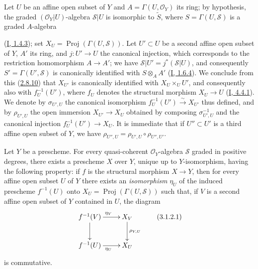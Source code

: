 \begin{env}[3.1.1]
Let $U$ be an affine open subset of $Y$ and $A=\Gamma(U,\mathcal{O}_Y)$ its
ring; by hypothesis, the graded $(\mathcal{O}_Y|U)$-algebra $\mathcal{S}|U$
is isomorphic to $\widetilde{S}$, where $S=\Gamma(U,\mathcal{S})$ is a graded
$A$-algebra


(\hyperref[I.1.4.3]{I, 1.4.3}); set
$X_U=\operatorname{Proj}(\Gamma(U,\mathcal{S}))$. Let $U'\subset U$ be a
second affine open subset of $Y$, $A'$ its ring, and $j:U'\to U$ the
canonical injection, which corresponds to the restriction homomorphism
$A\to A'$; we have $\mathcal{S}|U'=j^*(\mathcal{S}|U)$, and consequently
$S'=\Gamma(U',\mathcal{S})$ is canonically identified with $S\otimes_A A'$
(\hyperref[I.1.6.4]{I, 1.6.4}). We conclude from this
(\hyperref[II.2.8.10]{2.8.10}) that $X_{U'}$ is canonically identified
with $X_U\times_U U'$, and consequently also with $f_U^{-1}(U')$, where $f_U$
denotes the structural morphism $X_U\to U$
(\hyperref[I.4.4.1]{I, 4.4.1}). We denote by $\sigma_{U',U}$ the
canonical isomorphism $f_U^{-1}(U')\xrightarrow{\sim}X_{U'}$ thus defined,
and by $\rho_{U',U}$ the open immersion $X_{U'}\to X_U$ obtained by composing
$\sigma_{U',U}^{-1}$ and the canonical injection $f_U^{-1}(U')\to X_U$. It is
immediate that if $U''\subset U'$ is a third affine open subset of $Y$, we
have $\rho_{U'',U}=\rho_{U',U}\circ\rho_{U'',U'}$.
\end{env}

\begin{proposition}[3.1.2]
\label{II.3.1.2}
Let $Y$ be a prescheme. For every quasi-coherent $\mathcal{O}_Y$-algebra
$\mathcal{S}$ graded in positive degrees, there exists a prescheme $X$ over
$Y$, unique up to $Y$-isomorphism, having the following property: if $f$ is
the structural morphism $X\to Y$, then for every affine open subset $U$ of
$Y$ there exists an \emph{isomorphism} $\eta_U$ of the induced prescheme
$f^{-1}(U)$ onto $X_U=\operatorname{Proj}(\Gamma(U,\mathcal{S}))$ such that,
if $V$ is a second affine open subset of $Y$ contained in $U$, the diagram
\[
\label{II.3.1.2.1}
  \xymatrix{
    f^{-1}(V)\ar[r]^{\eta_V}\ar[d]
    & X_V\ar[d]^{\rho_{V,U}}\\
    f^{-1}(U)\ar[r]_{\eta_U}
    & X_U
  }
\tag{3.1.2.1}
\]
is commutative.
\end{proposition}

